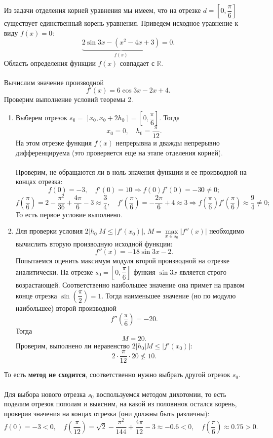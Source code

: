 \documentclass[a4paper, 12pt]{article}
\newcommand{\Rm}{\mathbb{R}}
\renewcommand{\leq}{\leqslant}
\begin{document}
	Из задачи отделения корней уравнения мы имеем, что на отрезке $d = \left[0, \dfrac\pi6\right]$ существует единственный корень уравнения. Приведем исходное уравнение к виду $f(x) = 0$: $$\underbrace{2\sin 3x - (x^2 - 4x+3)}_{f(x)} = 0.$$
	Область определения функции $f(x)$ совпадает с $\Rm$.\\\\
	Вычислим значение производной $$f'(x) = 6\cos 3x - 2x +4.$$	
	Проверим выполнение условий теоремы 2.
	\begin{enumerate}
		\item Выберем отрезок $s_0 = [x_0, x_0 + 2h_0] = \left[0, \dfrac\pi6\right]$. Тогда $$x_0 = 0,\quad h_0 = \dfrac{\pi }{12}.$$
		На этом отрезке функция $f(x)$ непрерывна и дважды непрерывно дифференцируема (это проверяется еще на этапе отделения корней).\\\\
		Проверим, не обращаются ли в ноль значения функции и ее производной на концах отрезка:
		$$f(0) = -3,\quad f'(0) = 10\Rightarrow f(0)f'(0) = -30\ne 0;$$
		$$f\left(\dfrac\pi6\right) = 2-\dfrac{\pi^2}{36} + \dfrac{4\pi}{6} - 3\approx \dfrac34,\quad f'\left(\dfrac\pi6\right) = -\dfrac{2\pi}{6} + 4\approx 3\Rightarrow f\left(\dfrac\pi6\right)f'\left(\dfrac\pi6\right) \approx \dfrac94\ne 0;$$
		То есть первое условие выполнено.
		\item Для проверки условия $2|h_0|M \leq |f'(x_0)|$, $M = \underset{x\in s_0}{\max}|f''(x)|$ необходимо вычислить вторую производную исходной функции:
		$$f''(x) = -18\sin 3x - 2.$$
		Попытаемся оценить максимум модуля второй производной на отрезке аналитически. На отрезке $s_0 = \left[0, \dfrac\pi6\right]$ функия $\sin3x$ является строго возрастающей. Соответственно наибольшее значение она примет на правом конце отрезка $\sin \left(\dfrac\pi2\right) =1$. Тогда наименьшее значение (но по модулю наибольшее) второй производной $$f''\left(\dfrac\pi6\right)=-20.$$
		Тогда $$M = 20.$$
		Проверим, выполнено ли неравенство $2|h_0|M \leq |f'(x_0)|$:
		$$2\cdot \dfrac{\pi}{12} \cdot 20 \not\leq 10.$$
	\end{enumerate}
		То есть \textbf{метод не сходится}, соответственно нужно выбрать другой отрезок $s_0$.\\\\
		Для выбора нового отрезка $s_0$ воспользуемся методом дихотомии, то есть поделим отрезок пополам и выясним, на какой из половинок остался корень, проверив значения на концах отрезка (они должны быть различны):
		$$f(0) = -3 < 0,\quad f\left(\dfrac{\pi}{12}\right) = \sqrt2 - \dfrac{\pi^2}{144} + \dfrac{4\pi}{12} -3\approx -0.6 < 0,\quad f\left(\dfrac{\pi}{6}\right)\approx 0.75 > 0.$$
\end{document}
